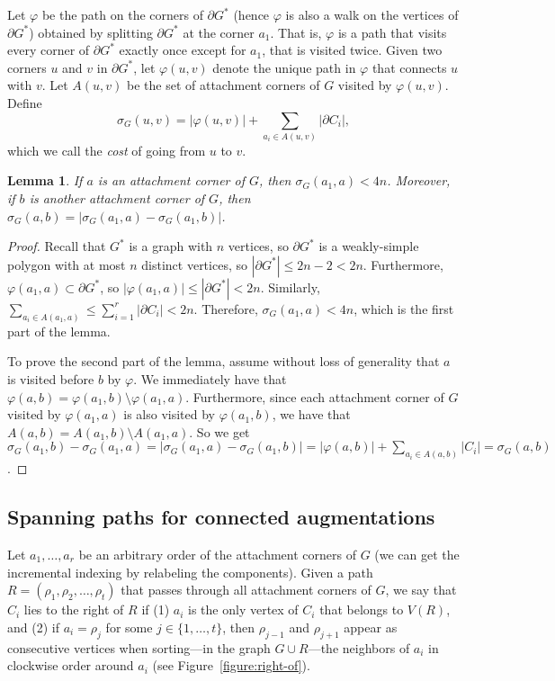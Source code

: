\documentclass{patmorin}
\newtheorem{lemma}[theorem]{Lemma}
\begin{document}
Let $\varphi$ be the path on the corners of $\partial G^*$ (hence $\varphi$ is also a walk on the vertices of $\partial G^*$) obtained by splitting $\partial G^*$ at the corner $a_1$. That is, $\varphi$ is a path that visits every corner of $\partial G^*$ exactly once except for $a_1$, that is visited twice.
Given two corners $u$ and $v$ in $\partial G^*$, let $\varphi(u,v)$ denote
the unique path in $\varphi$ that connects $u$ with $v$. Let $A(u,v)$ be
the set of attachment corners of $G$ visited by $\varphi(u,v)$. Define
    $$ \sigma_G(u,v) = |\varphi(u,v)| + \sum_{a_i\in A(u,v)}|\partial C_i|,$$
which we call the \emph{cost} of going from $u$ to $v$. 

\begin{lemma}\label{lemma:Contained in integer grid}
    If $a$ is an attachment corner of $G$, then $\sigma_G(a_1, a) < 4n$. Moreover, if $b$ is another attachment corner of $G$, then
  $\sigma_G(a, b) =  |\sigma_G(a_1, a)- \sigma_G(a_1, b)|$.
\end{lemma}
\begin{proof}
Recall that $G^*$ is a graph with $n$ vertices, so $\partial G^*$ is a weakly-simple polygon with at most $n$ distinct vertices, so $|\partial G^*|\le 2n-2<2n$.
Furthermore, $\varphi(a_1,a)\subset \partial G^*$, so
$|\varphi(a_1,a)|\le |\partial G^*|< 2n$.  Similarly, $\sum_{a_i\in A(a_1,a)} \le \sum_{i=1}^r |\partial C_i| < 2n$.
Therefore, $\sigma_G(a_1,a)< 4n$, which is the first part of the lemma.

To prove the second part of the lemma, 
assume without loss of generality that $a$ is visited before $b$ by $\varphi$.
We immediately have that $\varphi(a,b)=\varphi(a_1,b)\setminus\varphi(a_1,a)$.
Furthermore, since each attachment corner of $G$ visited by $\varphi(a_1, a)$ is also visited by $\varphi(a_1, b)$, we have that $A(a,b)=A(a_1,b)\setminus A(a_1,a)$.  So we get
$\sigma_G(a_1, b)- \sigma_G(a_1, a) = |\sigma_G(a_1, a) - \sigma_G(a_1, b)| = |\varphi(a, b)|  + \sum_{a_i\in A(a, b)} |C_i| = \sigma_G(a, b)$.
\end{proof}

\subsection{Spanning paths for connected augmentations}\label{section:Spanning paths for connected augmentations}
Let $a_1, \ldots, a_r$ be an arbitrary order of the attachment corners of $G$ (we can get the incremental indexing by relabeling the components). 
Given a path $R = (\rho_1, \rho_2, \ldots, \rho_t)$ that passes through all attachment corners of $G$, we say that $C_i$ lies to the right of $R$ if (1) $a_i$ is the only vertex of $C_i$ that belongs to $V(R)$, and (2) if $a_i = \rho_j$ for some $j\in\{1,\ldots,t\}$, then $\rho_{j-1}$ and $\rho_{j+1}$ appear as consecutive vertices when sorting---in the graph $G\cup R$---the neighbors of $a_i$ in clockwise order around $a_i$ (see Figure~\ref{figure:right-of}).
\end{document}
